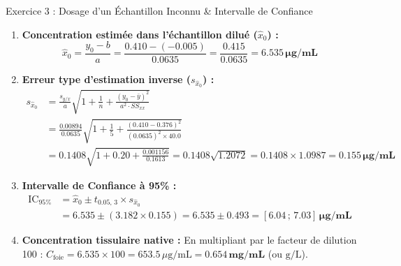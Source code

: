 \documentclass[11pt,a4paper]{article}
\begin{document}
\begin{solutionbox}{Exercice 3 : Dosage d'un Échantillon Inconnu \& Intervalle de Confiance}
\begin{enumerate}[label=\textbf{\alph*.}]
  \item \textbf{Concentration estimée dans l'échantillon dilué ($\hat{x}_0$) :}
  \begin{equation*}
    \hat{x}_0 = \frac{y_0 - b}{a} = \frac{0.410 - (-0.005)}{0.0635} = \frac{0.415}{0.0635} = \mathbf{6.535\,\mu\text{g/mL}}
  \end{equation*}

  \item \textbf{Erreur type d'estimation inverse ($s_{\hat{x}_0}$) :}
  \begin{align*}
    s_{\hat{x}_0} &= \frac{s_{y/x}}{a} \sqrt{1 + \frac{1}{n} + \frac{(y_0 - \bar{y})^2}{a^2 \cdot SS_{xx}}} \\
    &= \frac{0.00894}{0.0635} \sqrt{1 + \frac{1}{5} + \frac{(0.410 - 0.376)^2}{(0.0635)^2 \times 40.0}} \\
    &= 0.1408 \sqrt{1 + 0.20 + \frac{0.001156}{0.1613}} = 0.1408 \sqrt{1.2072} = 0.1408 \times 1.0987 = \mathbf{0.155\,\mu\text{g/mL}}
  \end{align*}

  \item \textbf{Intervalle de Confiance à 95\% :}
  \begin{align*}
    \text{IC}_{95\%} &= \hat{x}_0 \pm t_{0.05, \, 3} \times s_{\hat{x}_0} \\
    &= 6.535 \pm (3.182 \times 0.155) = 6.535 \pm 0.493 = \mathbf{[6.04 \,;\, 7.03]\,\mu\text{g/mL}}
  \end{align*}

  \item \textbf{Concentration tissulaire native :}
  En multipliant par le facteur de dilution 100 :
  $C_{\text{foie}} = 6.535 \times 100 = 653.5\,\mu\text{g/mL} = \mathbf{0.654\,\text{mg/mL}}$ (ou $\text{g/L}$).
\end{enumerate}
\end{solutionbox}
\end{document}
